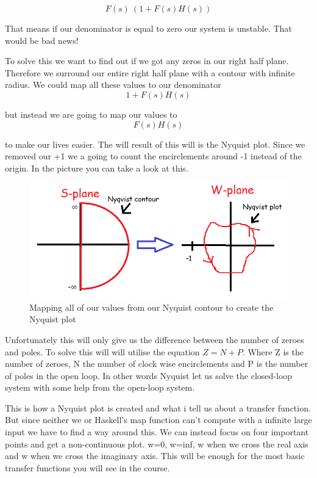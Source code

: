 \begin{equation*}
F(s) \ (1 + F(s)H(s))
\end{equation*}

That means if our denominator is equal to zero our system is unstable. That would be bad news!

To solve this we want to find out if we got any zeros in our right half plane. Therefore we surround our entire right half plane with a contour with infinite radius. We could map all these values to our denominator 
\begin{equation*}
1 + F(s)H(s)
\end{equation*}

but instead we are going to map our values to \begin{equation*}
F(s)H(s)
\end{equation*}

to make our lives easier. The will result of this will is the Nyquist plot. Since we removed our +1 we a going to count the encirclements around -1 instead of the origin. In the picture you can take a look at this.


\begin{figure}[h!]
    \centering
    \includegraphics[scale= 0.4]{Images/nykv.PNG}
    \caption{Mapping all of our values from our Nyquist contour to create the Nyquist plot}
    \label{Nyqvist}
\end{figure}

Unfortunately this will only give us the difference between the number of zeroes and poles. To solve this will will utilise the equation $Z = N + P$. Where Z is the number of zeroes, N the number of clock wise encirclements and P is the number of poles in the open loop. In other words Nyquist let us solve the closed-loop system with some help from the open-loop system.


This is how a Nyquist plot is created and what i tell us about a transfer function. But since neither we or Haskell's map function can't compute with a infinite large input we have to find a way around this. We can instead focus on four important points and get a non-continuous plot. w=0, w=inf, w when we cross the real axis and w when we cross the imaginary axis. This will be enough for the most basic transfer functions you will see in the course.